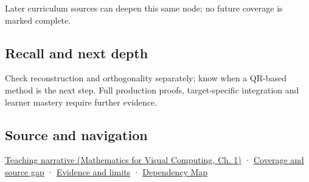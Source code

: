 Later curriculum sources can deepen this same node; no future coverage is marked complete.

\subsection{Recall and next depth}\label{appendix-c39f1ed34271-recall-and-next-depth}

Check reconstruction and orthogonality separately; know when a QR-based method is the next step. Full production proofs, target-specific integration and learner mastery require further evidence.

\subsection{Source and navigation}\label{appendix-c39f1ed34271-source-and-navigation}

\href{../02-Mathematics-for-Visual-Computing/main.pdf\#nameddest=01-foundations-i-ch017-orthonormal-frames-make-reconstruction-simple}{Teaching narrative (Mathematics for Visual Computing, Ch. 1)} · \hyperref[appendix-fd090d982a15-phase-6---parts-501-600]{Coverage and source gap} · \hyperref[appendix-a103e7846d21-phase-6---source-analysis-and-verification]{Evidence and limits} · \hyperref[appendix-4ad47bdd269a]{Dependency Map}
